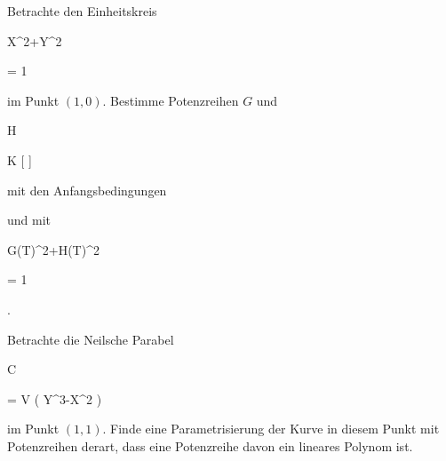 {


Betrachte den Einheitskreis


\mavergleichskette

{\vergleichskette

{ X^2+Y^2
}

{ = }{ 1
}

{  }{
}

{    }{
}

{   }{
}

}
{}{}{}
im Punkt $(1,0)$. Bestimme Potenzreihen $G$ und


\mavergleichskette

{\vergleichskette

{ H
}

{ \in }{ K [ \![ T ]\! ]
}

{  }{
}

{    }{
}

{   }{
}

}
{}{}{}
mit den Anfangsbedingungen

 und mit


\mavergleichskette

{\vergleichskette

{ G(T)^2+H(T)^2
}

{ = }{ 1
}

{  }{
}

{    }{
}

{   }{
}

}
{}{}{.}


}

{} {}



{}

{


Betrachte die Neilsche Parabel


\mavergleichskette

{\vergleichskette

{ C
}

{ = }{ V \left(  Y^3-X^2  \right)
}

{  }{
}

{    }{
}

{   }{
}

}
{}{}{}
im Punkt $(1,1)$. Finde eine Parametrisierung der Kurve in diesem Punkt mit Potenzreihen
 {} {}
derart, dass eine Potenzreihe davon ein lineares Polynom ist.


}

{} {}


